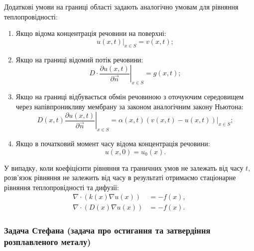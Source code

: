 Додаткові умови на границі області задають аналогічно умовам для рівняння теплопровідності:
\begin{enumerate}
	\item Якщо відома концентрація речовини на поверхні:
	\begin{equation}
		\left. u(x, t) \right|_{x \in S} = v(x, t);
	\end{equation}

	\item Якщо на границі відомий потік речовини:
	\begin{equation}
		\left. D \cdot \frac{\partial u(x, t)}{\partial \vec n} \right|_{x \in S} = g(x, t);
	\end{equation}

	\item Якщо на границі відбувається обмін речовиною з оточуючим середовищем через напівпроникливу мембрану за законом аналогічним закону Ньютона:
	\begin{equation}
		\left. D(x,t) \frac{\partial u(x, t)}{\partial \vec n} \right|_{x \in S} = \alpha(x,t) \left. ( v(x, t) - u(x, t) ) \right|_{x \in S};
	\end{equation}

	\item Якщо в початковий момент часу відома концентрація речовини:
	\begin{equation}
		u(x, 0) = u_0(x).
	\end{equation}
\end{enumerate}

\begin{remark}
	У випадку, коли коефіцієнти рівняння та граничних умов не залежать від часу $t$, розв'язок рівняння не залежить від часу в результаті отримаємо стаціонарне рівняння теплопровідності та дифузії:
	\begin{align}
		\nabla \cdot (k(x) \nabla u(x)) &= -f(x), \\
		\nabla \cdot (D(x) \nabla u(x)) &= -f(x).
	\end{align}
\end{remark}

\subsubsection{Задача Стефана (задача про остигання та затвердіння розплавленого металу)}

